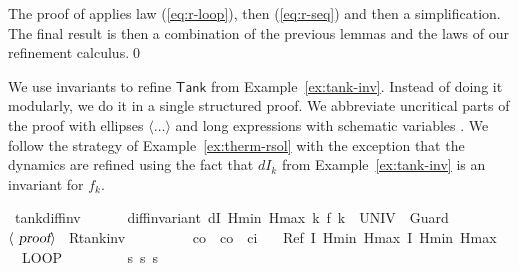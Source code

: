 \documentclass[envcountsame,envcountsect]{llncs}
\begin{document}
\begin{example}
The proof of  applies law (\ref{eq:r-loop}), then (\ref{eq:r-seq}) and then a simplification. The final result  is then a combination of the previous lemmas and the laws of our refinement calculus.\qed

\end{example}

\begin{example}\label{ex:tank-rinv}
We use invariants to refine $\mathsf{Tank}$ from Example~\ref{ex:tank-inv}. Instead of doing it modularly, we do it in a single structured proof. We abbreviate uncritical parts of the proof with ellipses $\langle \dots\rangle$ and long expressions with schematic variables . We follow the strategy of Example~\ref{ex:therm-rsol} with the exception that the dynamics are refined using the fact that $dI_k$ from Example~\ref{ex:tank-inv} is an invariant for $f_k$.
\begin{isabellebody}
\isanewline
{}\isamarkupfalse%
\ tank{\isacharunderscore}diff{\isacharunderscore}inv{\isacharcolon}\isanewline
\ \ {\isachardoublequoteopen}{}\ {\isasymle}\ {\isasymtau}\ {\isasymLongrightarrow}\ diff{\isacharunderscore}invariant\ {\isacharparenleft}dI\ Hmin\ Hmax\ k{\isacharparenright}\ {\isacharparenleft}f\ k{\isacharparenright}\ {\isacharbraceleft}{}{\isachardot}{\isachardot}{\isasymtau}{\isacharbraceright}\ UNIV\ {}\ Guard{\isachardoublequoteclose}\isanewline
\ \ $\langle \isa{proof}\rangle$\isanewline
\isanewline
{}\isamarkupfalse%
\ R{\isacharunderscore}tank{\isacharunderscore}inv{\isacharcolon}\isanewline
\ \ \ {\isachardoublequoteopen}{}\ {\isasymle}\ {\isasymtau}{\isachardoublequoteclose}\ \ {\isachardoublequoteopen}{}\ {\isacharless}\ c\isactrlsub o{\isachardoublequoteclose}\ \ {\isachardoublequoteopen}c\isactrlsub o\ {\isacharless}\ c\isactrlsub i{\isachardoublequoteclose}\isanewline
\ \ \ {\isachardoublequoteopen}Ref\ {\isasymlceil}I\ Hmin\ Hmax{\isasymrceil}\ {\isasymlceil}I\ Hmin\ Hmax{\isasymrceil}\ {\isasymge}\isanewline
\ \ {\isacharparenleft}LOOP\ \isanewline
\ \ \ %
\isanewline
\ \ \ {\isacharparenleft}{\isacharparenleft}{}\ {\isacharcolon}{\isacharcolon}{\isacharequal}{\isacharparenleft}{\isasymlambda}s{\isachardot}{}{\isacharparenright}{\isacharparenright}{\isacharsemicolon}{\isacharparenleft}{}\ {\isacharcolon}{\isacharcolon}{\isacharequal}{\isacharparenleft}{\isasymlambda}s{\isachardot}\ s{\isachardollar}{}{\isacharparenright}{\isacharparenright}{\isacharsemicolon}\isanewline

\end{isabellebody}
\end{example}
\end{document}
